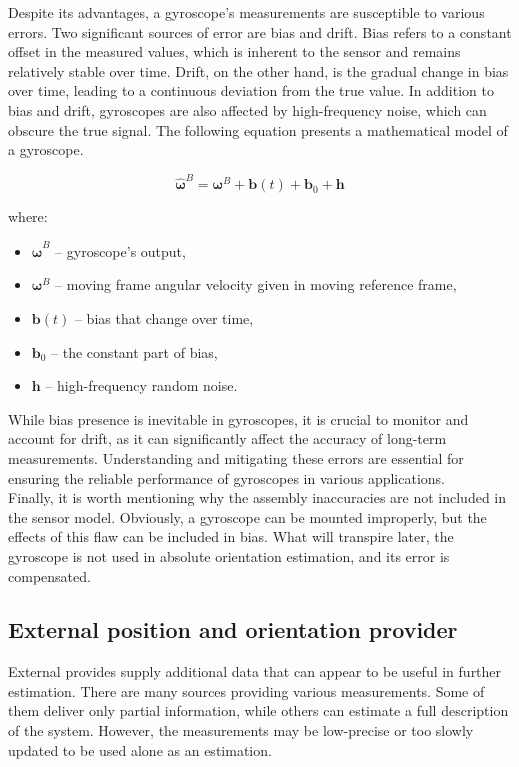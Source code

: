 Despite its advantages, a gyroscope's measurements are susceptible to various errors. Two significant sources of error are bias and drift. Bias refers to a constant offset in the measured values, which is inherent to the sensor and remains relatively stable over time. Drift, on the other hand, is the gradual change in bias over time, leading to a continuous deviation from the true value. In addition to bias and drift, gyroscopes are also affected by high-frequency noise, which can obscure the true signal. The following equation presents a mathematical model of a gyroscope.

\begin{equation}
	\bm{\hat{\omega}}^B = \bm{\omega}^B + \bm{b}(t) + \bm{b}_0 + \bm{h}
	\label{gyro_model}
\end{equation}

where:
\begin{itemize}
	\item $\bm{\hat{\omega}}^B$ -- gyroscope's output,
	\item $\bm{\omega}^B$ -- moving frame angular velocity given in moving reference frame,
	\item $\bm{b}(t)$ -- bias that change over time,
	\item $\bm{b}_0$ -- the constant part of bias, %
	\item $\bm{h}$ -- high-frequency random noise.
\end{itemize}

While bias presence is inevitable in gyroscopes, it is crucial to monitor and account for drift, as it can significantly affect the accuracy of long-term measurements. Understanding and mitigating these errors are essential for ensuring the reliable performance of gyroscopes in various applications.\\

Finally, it is worth mentioning why the assembly inaccuracies are not included in the sensor model. Obviously, a gyroscope can be mounted improperly, but the effects of this flaw can be included in bias. What will transpire later, the gyroscope is not used in absolute orientation estimation, and its error is compensated.

\subsection{External position and orientation provider}

External provides supply additional data that can appear to be useful in further estimation. There are many sources providing various measurements. Some of them deliver only partial information, while others can estimate a full description of the system. However, the measurements may be low-precise or too slowly updated to be used alone as an estimation.\\

